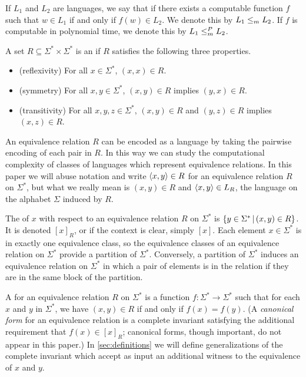 If $L_1$ and $L_2$ are languages, we say that  if there exists a computable function $f$ such that $w \in L_1$ if and only if $f(w) \in L_2$.
We denote this by $L_1 \leq_m L_2$.
If $f$ is computable in polynomial time, we denote this by $L_1 \leq^{P}_{m} L_2$.

A set $R \subseteq \Sigma^* \times \Sigma^*$ is an  if $R$ satisfies the following three properties.
\begin{itemize}
\item (reflexivity) For all $x \in \Sigma^*$, $(x,x)\in R$.
\item (symmetry) For all $x,y\in \Sigma^*$, $(x,y)\in R$ implies $(y,x)\in R$.
\item (transitivity) For all $x,y,z\in \Sigma^*$, $(x,y)\in R$ and $(y,z)\in R$ implies $(x,z)\in R$.
\end{itemize}
An equivalence relation $R$ can be encoded as a language by taking the pairwise encoding of each pair in $R$.
In this way we can study the computational complexity of classes of languages which represent equivalence relations.
In this paper we will abuse notation and write $\langle x,y\rangle\in R$ for an equivalence relation $R$ on $\Sigma^*$, but what we really mean is $(x,y)\in R$ and $\langle x,y\rangle\in L_R$, the language on the alphabet $\Sigma$ induced by $R$.

The  of $x$ with respect to an equivalence relation $R$ on $\Sigma^*$ is $\left\{ y\in \Sigma^* \, \middle| \, (x,y)\in R \right\}$.
It is denoted $[x]_R$, or if the context is clear, simply $[x]$.
Each element $x\in \Sigma^*$ is in exactly one equivalence class, so the equivalence classes of an equivalence relation on $\Sigma^*$ provide a partition of $\Sigma^*$.
Conversely, a partition of $\Sigma^*$ induces an equivalence relation on $\Sigma^*$ in which a pair of elements is in the relation if they are in the same block of the partition.

A  for an equivalence relation $R$ on $\Sigma^*$ is a function $f\colon \Sigma^* \to \Sigma^*$ such that for each $x$ and $y$ in $\Sigma^*$, we have $(x, y) \in R$ if and only if $f(x) = f(y)$.
(A \emph{canonical form} for an equivalence relation is a complete invariant satisfying the additional requirement that $f(x) \in [x]_R$; canonical forms, though important, do not appear in this paper.)
In \autoref{sec:definitions} we will define generalizations of the complete invariant which accept as input an additional witness to the equivalence of $x$ and $y$.

